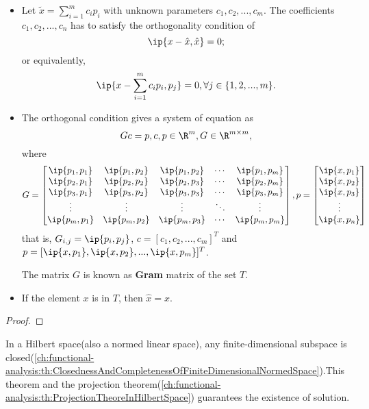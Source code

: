 \begin{refsection}
\begin{theorem}
	\begin{itemize}
		\item Let
		$\tilde{x} = \sum_{i=1}^m c_i p_i $ with unknown parameters $c_1,c_2,...,c_m$.  The coefficients $c_1,c_2,...,c_n$ has to satisfy the orthogonality condition of 
		$$\ip{x-\hat{x},\hat{x}} = 0;$$
		or equivalently,
		$$\ip{x-\sum_{i=1}^m c_ip_i,p_j} = 0,\forall j\in\{1,2,...,m\}.$$
		\item The orthogonal condition gives a system of equation as
			$$G c=p, c,p\in \R^m, G\in \R^{m\times m},$$
		where
		$$G = \begin{bmatrix}
		\ip{p_1,p_1} & \ip{p_1,p_2} & \ip{p_1,p_2} & \cdots & \ip{p_1,p_m}\\ 
		\ip{p_2,p_1}	& \ip{p_2,p_2} & \ip{p_2,p_3} & \cdots & \ip{p_2,p_m} \\ 
		\ip{p_3,p_1}	& \ip{p_3,p_2} & \ip{p_3,p_3} & \cdots & \ip{p_3,p_m}\\ 
		\vdots	& \vdots & \vdots & \ddots & \vdots\\ 
		\ip{p_m,p_1}	& \ip{p_m,p_2} & \ip{p_m,p_3} & \cdots & \ip{p_m,p_m} 
		\end{bmatrix}, p = \begin{bmatrix}
		\ip{x,p_1} \\
		\ip{x,p_2} \\
		\ip{x,p_3} \\
		\vdots \\
		\ip{x,p_n} 
		\end{bmatrix}$$
		that is, $G_{i,j}=\ip{p_i,p_j}$, $c=[c_1,c_2,...,c_m]^T$ and $p=[\ip{x,p_1},\ip{x,p_2},...,\ip{x,p_m}]^T$. 
		
		The matrix $G$ is known as \textbf{Gram} matrix of the set $T$.
		\item  If the element $x$ is in $T$, then $\hat{x} = x$.
	\end{itemize}
\end{theorem}
\begin{proof}
 	
\end{proof}

\begin{remark}
In a Hilbert space(also a normed linear space), any finite-dimensional subspace is closed(\autoref{ch:functional-analysis:th:ClosednessAndCompletenessOfFiniteDimensionalNormedSpace}).This theorem and the projection theorem(\autoref{ch:functional-analysis:th:ProjectionTheoreInHilbertSpace}) guarantees the existence of solution.	
\end{remark}




\end{refsection}
